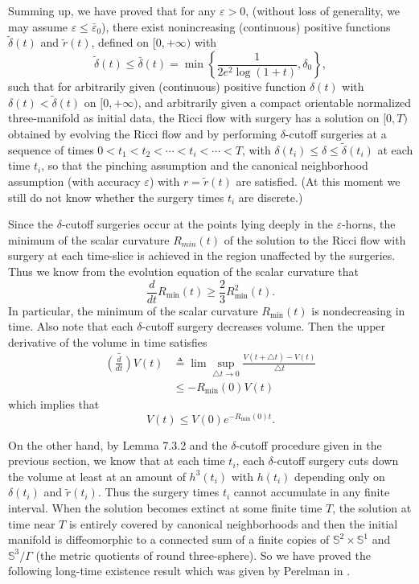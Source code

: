 Summing up, we have proved that for any $\varepsilon>0$, (without
loss of generality, we may assume $\varepsilon \leq
\bar{\varepsilon}_0$), there exist nonincreasing (continuous)
positive functions $\widetilde{\delta}(t)$ and $\widetilde{r}(t)$,
defined on $[0,+\infty)$ with
$$
\widetilde{\delta}(t) \leq \bar{\delta}(t) = \min
\left\{\frac{1}{{2e^2\log(1+t)}}, \delta_0\right\},
$$
such that for arbitrarily given (continuous) positive function
$\delta(t)$ with $\delta(t)<\widetilde{\delta}(t)$ on
$[0,+\infty)$, and arbitrarily given a compact orientable
normalized three-manifold as initial data, the Ricci flow with
surgery has a solution on $[0,T)$ obtained by evolving the Ricci
flow and by performing $\delta$-cutoff surgeries at a sequence of
times $0<t_1 < t_2 < \cdots < t_i < \cdots<T$, with ${\delta}(t_i)
\leq \delta \leq \widetilde{\delta}(t_i)$ at each time $t_i$, so
that the pinching assumption and the canonical neighborhood
assumption (with accuracy $\varepsilon$) with $r=\widetilde{r}(t)$
are satisfied.  (At this moment we still do not know whether the
surgery times $t_i$ are discrete.)

Since the $\delta$-cutoff surgeries occur at the points lying
deeply in the $\varepsilon$-horns, the minimum of the scalar
curvature $R_{min}(t)$ of the solution to the Ricci flow with
surgery at each time-slice is achieved in the region unaffected by
the surgeries. Thus we know from the evolution equation of the
scalar curvature that \begin{equation}
\frac{d}{dt}R_{\min}(t) \geq \frac{2}{3}R^2_{\min}(t).%
\end{equation} In particular, the minimum of the scalar curvature
$R_{\min}(t)$ is nondecreasing in time. Also note that each
$\delta$-cutoff surgery decreases volume. Then the upper
derivative of the volume in time satisfies
\begin{align*}
\bar{\left(\frac{d}{dt}\right)}V(t) &\triangleq \lim\sup_{\triangle
t\rightarrow
0}\frac{V(t+\triangle t)-V(t)}{\triangle t}\\
&\leq-R_{\min}(0)V(t)
\end{align*}
which implies that
$$
V(t)\leq V(0)e^{-R_{\min}(0)t}.
$$

On the other hand, by Lemma 7.3.2 and the $\delta$-cutoff procedure
given in the previous section, we know that at each time $t_i$, each
$\delta$-cutoff surgery cuts down the volume at least at an amount
of $h^3(t_i)$ with $h(t_i)$ depending only on ${\delta}(t_i)$ and
$\widetilde{r}(t_i)$. Thus the surgery times $t_i$ cannot accumulate
in any finite interval. When the solution becomes extinct at some
finite time $T$, the solution at time near $T$ is entirely covered
by canonical neighborhoods and then the initial manifold is
diffeomorphic to a connected sum of a finite copies of
$\mathbb{S}^2\times \mathbb{S}^1$ and $\mathbb{S}^3/\Gamma$ (the
metric quotients of round three-sphere). So we have proved the
following long-time existence result which was given by Perelman in
\cite{P2}.

